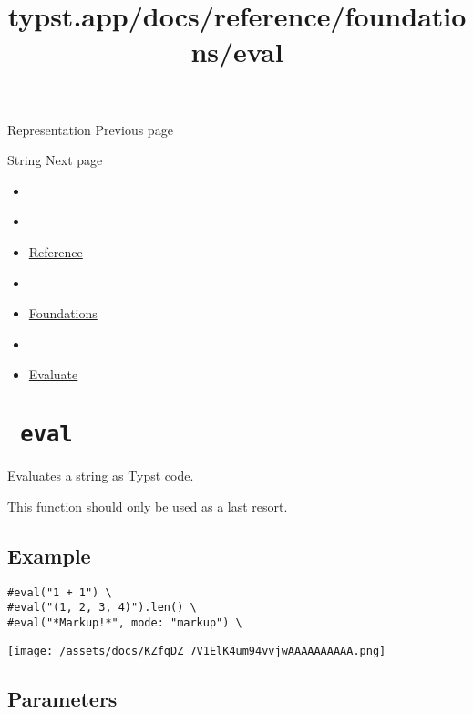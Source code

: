 \href{/docs/reference/foundations/repr/}{\pandocbounded{}}

{ Representation } { Previous page }

\href{/docs/reference/foundations/str/}{\pandocbounded{}}

{ String } { Next page }


\title{typst.app/docs/reference/foundations/eval}

\begin{itemize}
\tightlist
\item
  \href{/docs}{}
\item
  
\item
  \href{/docs/reference/}{Reference}
\item
  
\item
  \href{/docs/reference/foundations/}{Foundations}
\item
  
\item
  \href{/docs/reference/foundations/eval/}{Evaluate}
\end{itemize}

\section{\texorpdfstring{\texttt{\ eval\ }}{ eval }}\label{summary}

Evaluates a string as Typst code.

This function should only be used as a last resort.

\subsection{Example}\label{example}

\begin{verbatim}
#eval("1 + 1") \
#eval("(1, 2, 3, 4)").len() \
#eval("*Markup!*", mode: "markup") \
\end{verbatim}

\texttt{[image: /assets/docs/KZfqDZ\_7V1ElK4um94vvjwAAAAAAAAAA.png]}

\subsection{\texorpdfstring{{ Parameters
}}{ Parameters }}\label{parameters}

